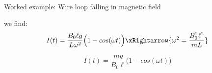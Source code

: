 {\begin{frame}{Worked example: Wire loop falling in magnetic field}
  \vspace{0.2cm}
  
  we find:
  \begin{equation*}
     I(t) =
        \frac{B_0 \ell g}{L \omega^2}
        \Big( 1 - cos(\omega t) \Big)
        \xRightarrow{\omega^2 = \frac{B_0^2 \ell^2}{mL}}
  \end{equation*}


  \begin{equation*}
     I(t) =
        \frac{mg}{B_0 \ell}
        \Big( 1 - cos(\omega t) \Big)
  \end{equation*}

\end{frame}

} %

